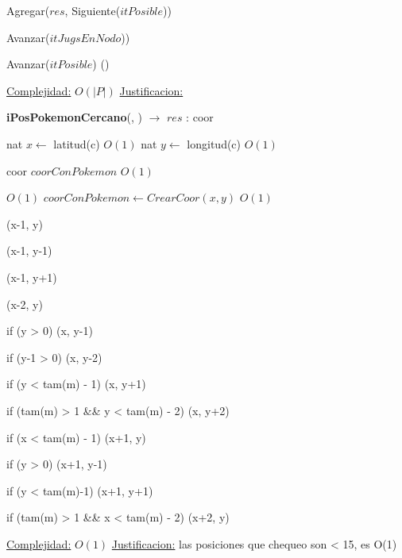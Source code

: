 \begin{Algoritmos}
\begin{algorithm}[H]
\begin{algorithmic}[1]
			\State Agregar($res$, Siguiente($itPosible$))
	
		\EndIf
		
		\State Avanzar($itJugsEnNodo$))
	
	\EndWhile
	
	\State Avanzar($itPosible$)   \Comment()



\EndWhile


\medskip
\State \underline{Complejidad:} $O(|P|)$
\State \underline{Justificacion:} 

\end{algorithmic}
\end{algorithm}



\begin{algorithm}[H]
{\textbf{iPosPokemonCercano}(, ) $\to$ $res$ : coor}
\begin{algorithmic}[1]


\State nat $x \gets$ latitud(c)    \Comment $O(1)$
\State nat $y \gets$ longitud(c)   \Comment $O(1)$


\State coor $coorConPokemon$    \Comment $O(1)$

     \Comment $O(1)$
	\State $coorConPokemon \gets CrearCoor(x, y)$    \Comment $O(1)$
\EndIf

	(x-1, y)
		
		(x-1, y-1)
	\EndIf

		(x-1, y+1)
	\EndIf

		(x-2, y)
	\EndIf
	
\EndIf

if (y > 0)
	(x, y-1)
	
	if (y-1 > 0)
		(x, y-2)

if (y < tam(m) - 1)
	(x, y+1)
	
	if (tam(m) > 1 && y < tam(m) - 2)
		(x, y+2)


if (x < tam(m) - 1)
	(x+1, y)

	if (y > 0)
		(x+1, y-1)

	if (y < tam(m)-1)
		(x+1, y+1)


if (tam(m) > 1 && x < tam(m) - 2)
	(x+2, y)


\medskip
\State \underline{Complejidad:} $O(1)$ %
\State \underline{Justificacion:} las posiciones que chequeo son < 15, es O(1)

\end{algorithmic}
\end{algorithm}



  
\end{Algoritmos}